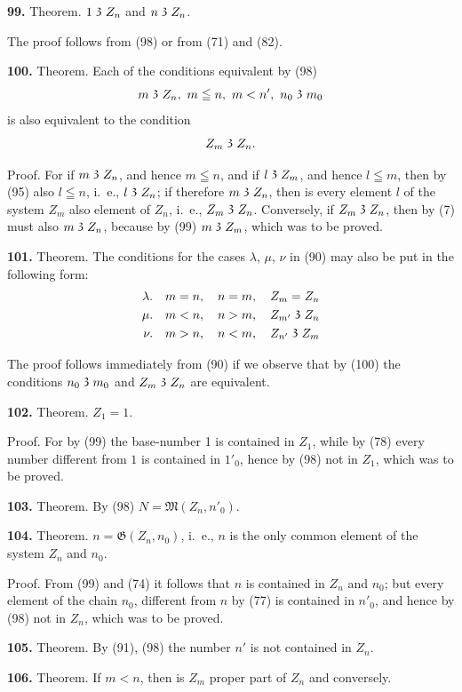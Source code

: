\documentclass[oneside]{book}
\newcommand\partof{\mathrel{\raisebox{0.45ex}{$\mathfrak{3}$}}}   %
\newcommand\mypara{\medskip\textbf}
\begin{document}
\mypara{99.} Theorem. $1\partof Z_n$ and $n\partof Z_n$.


The proof follows from (98) or from (71) and (82).

\mypara{100.} Theorem. Each of the conditions equivalent
by (98)
\[
m\partof Z_n,\ m\leqq n,\ m<n',\ n_0\partof m_0
\]
is also equivalent to the condition
\[
Z_m\partof Z_n.
\]

Proof. For if $m\partof Z_n$, and hence $m\leqq n$, and if $l\partof Z_m$,
and hence $l\leqq m$, then by (95) also $l\leqq n$, i.~e., $l\partof Z_n$; if
therefore $m\partof Z_n$, then is every element $l$ of the system
$Z_m$ also element of $Z_n$, i.~e., $Z_m\partof Z_n$. Conversely, if
$Z_m\partof Z_n$, then by (7) must also $m\partof Z_n$, because by (99)
$m\partof Z_m$, which was to be proved.

\mypara{101.} Theorem. The conditions for the cases $\lambda$, $\mu$,
$\nu$ in (90) may also be put in the following form:
\begin{eqnarray*}
\lambda. & \quad m=n,\quad n=m,\quad Z_m=Z_n\\
\mu. & \quad m<n,\quad n>m,\quad Z_{m'}\partof Z_n\\
\nu. & \quad m>n,\quad n<m,\quad Z_{n'}\partof Z_m
\end{eqnarray*}

The proof follows immediately from (90) if we observe
that by (100) the conditions $n_0\partof m_0$ and $Z_m\partof Z_n$ are
equivalent.

\mypara{102.} Theorem. $Z_1=1$.

Proof. For by (99) the base-number 1 is contained
in $Z_1$, while by (78) every number different
from $1$ is contained in $1'_0$, hence by (98) not in $Z_1$,
which was to be proved.

\mypara{103.} Theorem. By (98) $N=\mathfrak{M}(Z_n, n'_0)$.

\mypara{104.} Theorem. $n=\mathfrak{G}(Z_n, n_0)$, i.~e., $n$ is the only
common element of the system $Z_n$ and $n_0$.

Proof. From (99) and (74) it follows that $n$ is
contained in $Z_n$ and $n_0$; but every element of the chain
$n_0$, different from $n$ by (77) is contained in $n'_0$, and hence
by (98) not in $Z_n$, which was to be proved.

\mypara{105.} Theorem. By (91), (98) the number $n'$ is not
contained in $Z_n$.

\mypara{106.} Theorem. If $m<n$, then is $Z_m$ proper part
of $Z_n$ and conversely.
\end{document}
